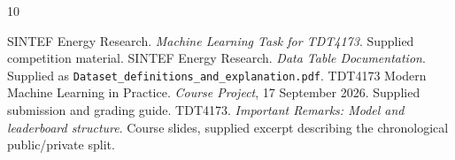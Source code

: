 \documentclass[a4paper,11pt]{article}
\begin{document}
\begin{thebibliography}{10}
\raggedright
{} SINTEF Energy Research. \emph{Machine Learning Task for TDT4173}. Supplied competition material.
 SINTEF Energy Research. \emph{Data Table Documentation}. Supplied as \texttt{Dataset\_definitions\_and\_explanation.pdf}.
 TDT4173 Modern Machine Learning in Practice. \emph{Course Project}, 17 September 2026. Supplied submission and grading guide.
 TDT4173. \emph{Important Remarks: Model and leaderboard structure}. Course slides, supplied excerpt describing the chronological public/private split.
\end{thebibliography}
\end{document}
